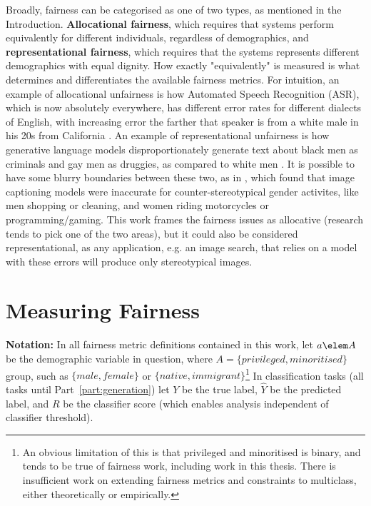Broadly, fairness can be categorised as one of two types, as mentioned in the Introduction. \textbf{Allocational fairness}, which requires that systems perform equivalently for different individuals, regardless of demographics, and \textbf{representational fairness}, which requires that the systems represents different demographics with equal dignity. How exactly "equivalently" is measured is what determines and differentiates the available fairness metrics. For intuition, an example of allocational unfairness is how Automated Speech Recognition (ASR), which is now absolutely everywhere, has different error rates for different dialects of English, with increasing error the farther that speaker is from a white male in his 20s from California \citep{tatman_2017}. An example of representational unfairness is how generative language models disproportionately generate text about black men as criminals and gay men as druggies, as compared to white men \citep{sheng-etal-2019-woman}. It is possible to have some blurry boundaries between these two, as in \citet{zhao-etal-2017-men}, which found that image captioning models were inaccurate for counter-stereotypical gender activites, like men shopping or cleaning, and women riding motorcycles or programming/gaming. This work frames the fairness issues as allocative (research tends to pick one of the two areas), but it could also be considered representational, as any application, e.g. an image search, that relies on a model with these errors will produce only stereotypical images.

\section{Measuring Fairness}
\label{sec:measuring_fairness}
\textbf{Notation:} In all fairness metric definitions contained in this work, let $a \elem A$ be the demographic variable in question, where $A = \{privileged, minoritised\}$ group, such as $\{male, female\}$ or $\{native, immigrant\}$\footnote{An obvious limitation of this is that privileged and minoritised is binary, and tends to be true of fairness work, including work in this thesis. There is insufficient work on extending fairness metrics and constraints to multiclass, either theoretically or empirically.} In classification tasks (all tasks until Part~\ref{part:generation}) let $Y$ be the true label, $\hat{Y}$ be the predicted label, and $R$ be the classifier score (which enables analysis independent of classifier threshold). 

